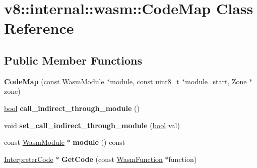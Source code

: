 \hypertarget{classv8_1_1internal_1_1wasm_1_1CodeMap}{}\section{v8\+:\+:internal\+:\+:wasm\+:\+:Code\+Map Class Reference}
\label{classv8_1_1internal_1_1wasm_1_1CodeMap}
\subsection*{Public Member Functions}
\begin{DoxyCompactItemize}
\item 
\mbox{\label{classv8_1_1internal_1_1wasm_1_1CodeMap_a02c9d3c246af535d75e39206385ecd78}} 
{\bfseries Code\+Map} (const \mbox{\hyperlink{structv8_1_1internal_1_1wasm_1_1WasmModule}{Wasm\+Module}} $\ast$module, const uint8\+\_\+t $\ast$module\+\_\+start, \mbox{\hyperlink{classv8_1_1internal_1_1Zone}{Zone}} $\ast$zone)
\item 
\mbox{\label{classv8_1_1internal_1_1wasm_1_1CodeMap_a871e1b20f6655d0073ced2f2bb3c6279}} 
\mbox{\hyperlink{classbool}{bool}} {\bfseries call\+\_\+indirect\+\_\+through\+\_\+module} ()
\item 
\mbox{\label{classv8_1_1internal_1_1wasm_1_1CodeMap_af4dfda1a23b5e64c417fa371e5b71a26}} 
void {\bfseries set\+\_\+call\+\_\+indirect\+\_\+through\+\_\+module} (\mbox{\hyperlink{classbool}{bool}} val)
\item 
\mbox{\label{classv8_1_1internal_1_1wasm_1_1CodeMap_adf0a65944909935b06e32ff755887cfe}} 
const \mbox{\hyperlink{structv8_1_1internal_1_1wasm_1_1WasmModule}{Wasm\+Module}} $\ast$ {\bfseries module} () const
\item 
\mbox{\label{classv8_1_1internal_1_1wasm_1_1CodeMap_a88f38c9975894bbdee0bbdf6815189f5}} 
\mbox{\hyperlink{structv8_1_1internal_1_1wasm_1_1InterpreterCode}{Interpreter\+Code}} $\ast$ {\bfseries Get\+Code} (const \mbox{\hyperlink{structv8_1_1internal_1_1wasm_1_1WasmFunction}{Wasm\+Function}} $\ast$function)
\item 

\end{DoxyCompactItemize}
